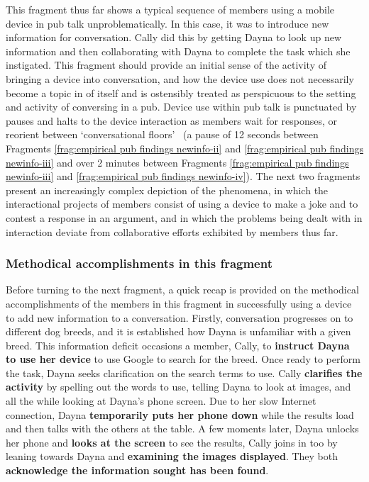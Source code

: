 \begin{revisedsubmission}
This fragment thus far shows a typical sequence of members using a mobile device in pub talk unproblematically.
In this case, it was to introduce new information for conversation.
Cally did this by getting Dayna to look up new information and then collaborating with Dayna to complete the task which she instigated.
This fragment should provide an initial sense of the activity of bringing a device into conversation, and how the device use does not necessarily become a topic in of itself and is ostensibly treated as perspicuous to the setting and activity of conversing in a pub.
Device use within pub talk is punctuated by pauses and halts to the device interaction as members wait for responses, or reorient between `conversational floors'~\citep{Edelsky1981} (a pause of 12 seconds between Fragments \ref{frag:empirical pub findings newinfo-ii} and \ref{frag:empirical pub findings newinfo-iii} and over 2 minutes between Fragments \ref{frag:empirical pub findings newinfo-iii} and \ref{frag:empirical pub findings newinfo-iv}).
The next two fragments present an increasingly complex depiction of the phenomena, in which the interactional projects of members consist of using a device to make a joke and to contest a response in an argument, and in which the problems being dealt with in interaction deviate from collaborative efforts exhibited by members thus far.
\end{revisedsubmission}






\subsubsection{Methodical accomplishments in this fragment}\label{sec:empirical pub findings newinfo methods}
\begin{revisedsubmission}
Before turning to the next fragment, a quick recap is provided on the methodical accomplishments of the members in this fragment in successfully using a device to add new information to a conversation.
Firstly, conversation progresses on to different dog breeds, and it is established how Dayna is unfamiliar with a given breed.
This information deficit occasions a member, Cally, to \textbf{instruct Dayna to use her device} to use Google to search for the breed.
Once ready to perform the task, Dayna seeks clarification on the search terms to use.
Cally \textbf{clarifies the activity} by spelling out the words to use, telling Dayna to look at images, and all the while looking at Dayna's phone screen.
Due to her slow Internet connection, Dayna \textbf{temporarily puts her phone down} while the results load and then talks with the others at the table.
A few moments later, Dayna unlocks her phone and \textbf{looks at the screen} to see the results, Cally joins in too by leaning towards Dayna and \textbf{examining the images displayed}.
They both \textbf{acknowledge the information sought has been found}.
\end{revisedsubmission}



